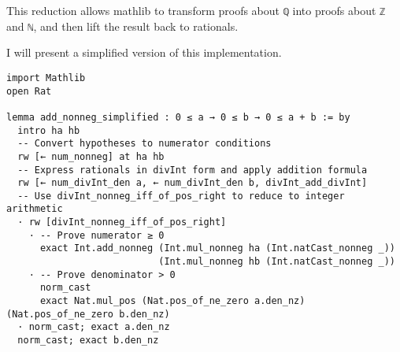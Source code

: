 This reduction allows mathlib to transform proofs about \lstinline[language=lean]|ℚ| 
into proofs about \lstinline[language=lean]|ℤ| and \lstinline[language=lean]|ℕ|, 
and then lift the result back to rationals.
\begin{example}
  I will present a simplified version of this implementation.
  \begin{lstlisting}[language=lean]
import Mathlib
open Rat 

lemma add_nonneg_simplified : 0 ≤ a → 0 ≤ b → 0 ≤ a + b := by
  intro ha hb
  -- Convert hypotheses to numerator conditions
  rw [← num_nonneg] at ha hb
  -- Express rationals in divInt form and apply addition formula
  rw [← num_divInt_den a, ← num_divInt_den b, divInt_add_divInt]
  -- Use divInt_nonneg_iff_of_pos_right to reduce to integer arithmetic
  · rw [divInt_nonneg_iff_of_pos_right]
    · -- Prove numerator ≥ 0
      exact Int.add_nonneg (Int.mul_nonneg ha (Int.natCast_nonneg _))
                           (Int.mul_nonneg hb (Int.natCast_nonneg _))
    · -- Prove denominator > 0
      norm_cast
      exact Nat.mul_pos (Nat.pos_of_ne_zero a.den_nz) (Nat.pos_of_ne_zero b.den_nz)
  · norm_cast; exact a.den_nz
  norm_cast; exact b.den_nz


\end{lstlisting}
\end{example}
